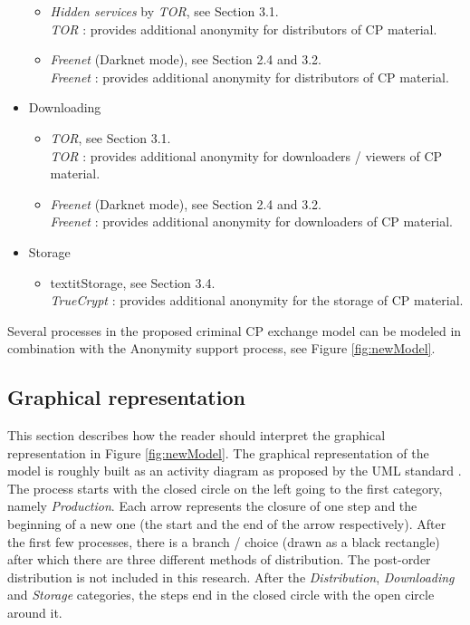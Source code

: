 \documentclass{sig-alternate-br}
\begin{document}
\begin{itemize}
\begin{itemize}
			\item \textit{Hidden services} by \textit{TOR}, see Section 3.1.\\
				\textit{TOR} \cite{dingledine2004tor}: provides additional anonymity for distributors of CP material.
			\item \textit{Freenet} (Darknet mode), see Section 2.4 and 3.2.\\
				\textit{Freenet} \cite{clarke2001freenet, callanan2009internet}: provides additional anonymity for distributors of CP material.
		\end{itemize}
	\item Downloading
		\begin{itemize}
			\item \textit{TOR}, see Section 3.1.\\
				\textit{TOR} \cite{dingledine2004tor}: provides additional anonymity for downloaders / viewers of CP material.
			\item \textit{Freenet} (Darknet mode), see Section 2.4 and 3.2.\\
				\textit{Freenet} \cite{clarke2001freenet,callanan2009internet}: provides additional anonymity for downloaders of CP material.
		\end{itemize}
	\item Storage
		\begin{itemize}
			\item textit{Storage}, see Section 3.4.\\
				\textit{TrueCrypt} \cite{miao2010research}: provides additional anonymity for the storage of CP material.
		\end{itemize}
\end{itemize}
Several processes in the proposed criminal CP exchange model can be modeled in combination with the Anonymity support process, see Figure \ref{fig:newModel}.

\subsection{Graphical representation}
This section describes how the reader should interpret the graphical representation in Figure \ref{fig:newModel}. The graphical representation of the model is roughly built as an activity diagram as proposed by the UML standard \cite{eriksson2000business}. The process starts with the closed circle on the left going to the first category, namely \textit{Production}. Each arrow represents the closure of one step and the beginning of a new one (the start and the end of the arrow respectively). After the first few processes, there is a branch / choice (drawn as a black rectangle) after which there are three different methods of distribution. The post-order distribution is not included in this research. After the \textit{Distribution}, \textit{Downloading} and \textit{Storage} categories, the steps end in the closed circle with the open circle around it.
\end{document}
